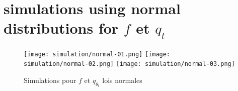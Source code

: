 \section{simulations using normal distributions for $f$ et $q_t$}

\begin{figure}[H]
    \centering
    \texttt{[image: simulation/normal-01.png]}
    \texttt{[image: simulation/normal-02.png]}
    \texttt{[image: simulation/normal-03.png]}
    \caption{Simulations pour $f$ et $q_{\theta_t}$ lois normales}
    \label{sim:normal}
\end{figure}